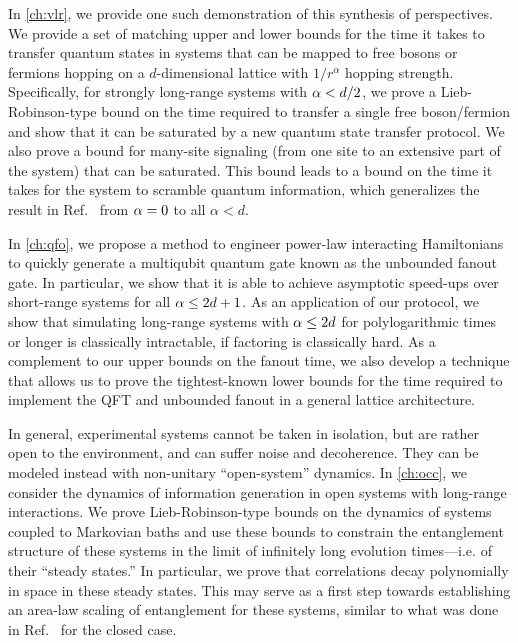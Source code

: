 In \cref{ch:vlr}, we provide one such demonstration of this synthesis of perspectives. We provide a set of matching upper and lower bounds for the time it takes to transfer quantum states in systems that can be mapped to free bosons or fermions hopping on a $d$-dimensional lattice with $1/r^{\alpha}$ hopping strength. Specifically, for strongly long-range systems with $\alpha < d/2$, we prove a Lieb-Robinson-type bound on the time required to transfer a single free boson/fermion and show that it can be saturated by a new quantum state transfer protocol. We also prove a bound for many-site signaling (from one site to an extensive part of the system) that can be saturated. This bound leads to a bound on the time it takes for the system to scramble quantum information, which generalizes the result in Ref.~\cite{Lashkari13} from $\alpha = 0$ to all $\alpha<d$.

In \cref{ch:qfo}, we propose a method to engineer power-law interacting Hamiltonians to quickly generate a multiqubit quantum gate known as the unbounded fanout gate. In particular, we show that it is able to achieve asymptotic speed-ups over short-range systems for all $\alpha \le 2d+1$. As an application of our protocol, we show that simulating long-range systems with $\alpha \le 2d$ for polylogarithmic times or longer is classically intractable, if factoring is classically hard. As a complement to our upper bounds on the fanout time, we also develop a technique that allows us to prove the tightest-known lower bounds for the time required to implement the QFT and unbounded fanout in a general lattice architecture.

In general, experimental systems cannot be taken in isolation, but are rather open to the environment, and can suffer noise and decoherence.
They can be modeled instead with non-unitary ``open-system'' dynamics.
In \cref{ch:occ}, we consider the dynamics of information generation in open systems with long-range interactions. We prove Lieb-Robinson-type bounds on the dynamics of systems coupled to Markovian baths and use these bounds to constrain the entanglement structure of these systems in the limit of infinitely long evolution times---i.e. of their ``steady states.'' In particular, we prove that correlations decay polynomially in space in these steady states. This may serve as a first step towards establishing an area-law scaling of entanglement for these systems, similar to what was done in Ref.~\cite{Gong2017} for the closed case. %

